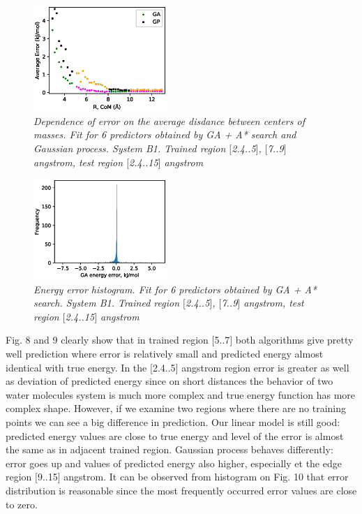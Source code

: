 \documentclass[aip,jcp,reprint,amsmath,amssymb,nature]{revtex4-1}
\begin{document}
\begin{figure}[h]
\centering
\includegraphics[width=0.45\textwidth]{media/B1_gap_Error_6_predictors.eps}
\caption{\textit{Dependence of error on the average disdance between centers of masses. Fit for 6 predictors obtained by GA + A* search and Gaussian process. System B1. Trained region $[$2.4..5$]$, 
$[$7..9$]$ angstrom, test region $[$2.4..15$]$ angstrom}}\label{Fig:B1_gap_RMSE_6_predictors}
\end{figure}

\begin{figure}[h]
\includegraphics[width=0.45\textwidth]{media/B1_gap_GA_energy_error_histogram_6_predictors.eps}
\caption{\textit{Energy error histogram. Fit for 6 predictors obtained by GA + A* search. System B1. Trained region $[$2.4..5$]$, 
$[$7..9$]$ angstrom, test region $[$2.4..15$]$ angstrom}}\label{Fig:B1_gap_histogram_6_predictors}
\end{figure}


Fig. 8 and 9 clearly show that in trained region $[$5..7$]$ both 
algorithms give pretty well prediction where error is relatively small 
and predicted energy almost identical with true energy. In the 
$[$2.4..5$]$ angstrom region error is greater as well as deviation of 
predicted energy since on short distances the behavior of two water 
molecules system is much more complex and true energy function has more 
complex shape. However, if we examine two regions where there are no 
training points we can see a big difference in prediction. Our linear 
model is still good: predicted energy values are close to true energy 
and level of the error is almost the same as in adjacent trained region. 
Gaussian process behaves differently: error goes up and values of 
predicted energy also higher, especially et the edge region $[$9..15$]$ 
angstrom. It can be observed from histogram on Fig. 10 that error 
distribution is reasonable since the most frequently occurred error 
values are close to zero.
\end{document}
